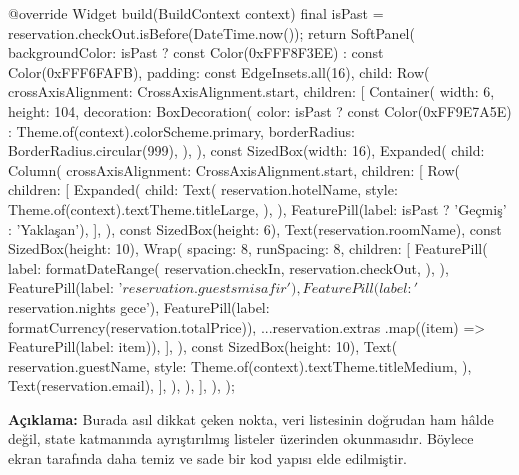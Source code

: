 \documentclass[11pt,a4paper]{article}
\begin{document}
\begin{codeblock}
{  @override
  Widget build(BuildContext context) {
    final isPast = reservation.checkOut.isBefore(DateTime.now());
    return SoftPanel(
      backgroundColor:
          isPast ? const Color(0xFFF8F3EE) : const Color(0xFFF6FAFB),
      padding: const EdgeInsets.all(16),
      child: Row(
        crossAxisAlignment: CrossAxisAlignment.start,
        children: [
          Container(
            width: 6,
            height: 104,
            decoration: BoxDecoration(
              color: isPast
                  ? const Color(0xFF9E7A5E)
                  : Theme.of(context).colorScheme.primary,
              borderRadius: BorderRadius.circular(999),
            ),
          ),
          const SizedBox(width: 16),
          Expanded(
            child: Column(
              crossAxisAlignment: CrossAxisAlignment.start,
              children: [
                Row(
                  children: [
                    Expanded(
                      child: Text(
                        reservation.hotelName,
                        style: Theme.of(context).textTheme.titleLarge,
                      ),
                    ),
                    FeaturePill(label: isPast ? 'Geçmiş' : 'Yaklaşan'),
                  ],
                ),
                const SizedBox(height: 6),
                Text(reservation.roomName),
                const SizedBox(height: 10),
                Wrap(
                  spacing: 8,
                  runSpacing: 8,
                  children: [
                    FeaturePill(
                      label: formatDateRange(
                        reservation.checkIn,
                        reservation.checkOut,
                      ),
                    ),
                    FeaturePill(label: '${reservation.guests} misafir'),
                    FeaturePill(label: '${reservation.nights} gece'),
                    FeaturePill(label: formatCurrency(reservation.totalPrice)),
                    ...reservation.extras
                        .map((item) => FeaturePill(label: item)),
                  ],
                ),
                const SizedBox(height: 10),
                Text(
                  reservation.guestName,
                  style: Theme.of(context).textTheme.titleMedium,
                ),
                Text(reservation.email),
              ],
            ),
          ),
        ],
      ),
    );
  }
}
\end{codeblock}

\textbf{Açıklama:} Burada asıl dikkat çeken nokta, veri listesinin doğrudan ham hâlde değil, state katmanında ayrıştırılmış listeler üzerinden okunmasıdır. Böylece ekran tarafında daha temiz ve sade bir kod yapısı elde edilmiştir.
\end{document}

